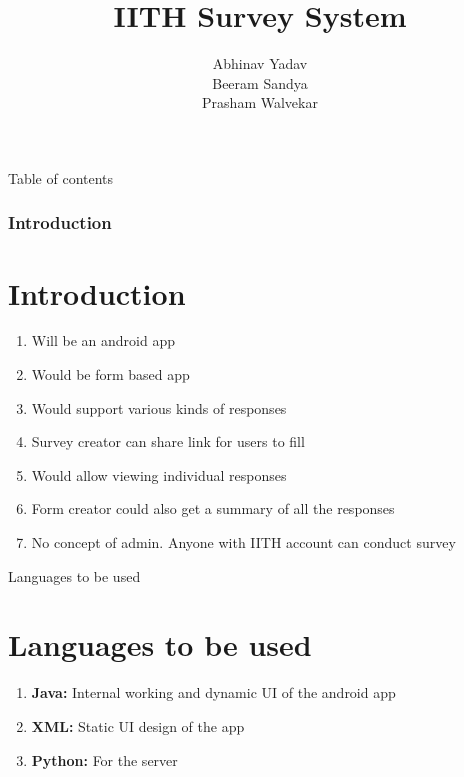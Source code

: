 \documentclass{beamer}
\title{IITH Survey System}
\author{Abhinav Yadav\\
        Beeram Sandya\\
        Prasham Walvekar}
\begin{document}
    \maketitle

    \begin{frame}{Table of contents}
        \tableofcontents
    \end{frame}

    \begin{frame}
        \frametitle{Introduction}
        \section{Introduction}
        \begin{enumerate}
            \item Will be an android app
            \item Would be form based app
            \item Would support various kinds of responses
            \item Survey creator can share link for users to fill
            \item Would allow viewing individual responses
            \item Form creator could also get a summary of all the responses
            \item No concept of admin. Anyone with IITH account can conduct survey
        \end{enumerate}
    \end{frame}

    \begin{frame}{Languages to be used}
        \section{Languages to be used}
        \begin{enumerate}
            \item \textbf{Java:} Internal working and dynamic UI of the android app
            \item \textbf{XML:} Static UI design of the app
            \item \textbf{Python:} For the server
        \end{enumerate}
        
    \end{frame}
\end{document}
